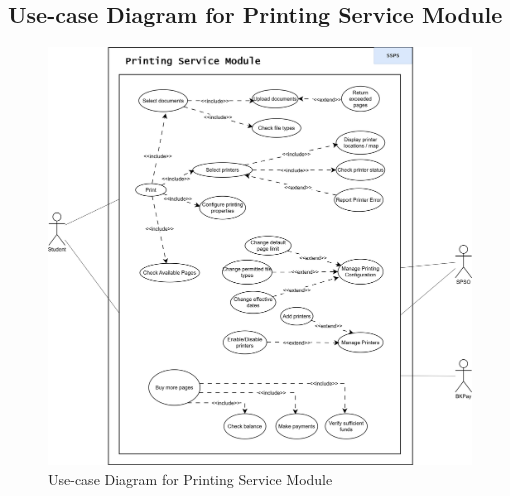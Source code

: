 \subsection{Use-case Diagram for Printing Service Module}

\begin{figure}[H]
    \centering
    \includegraphics[width=\textwidth]{images/usecase_diagram/use_case_printing_service.png}
    \caption{Use-case Diagram for Printing Service Module}
    \label{fig:use_case_printing_service}
\end{figure}

